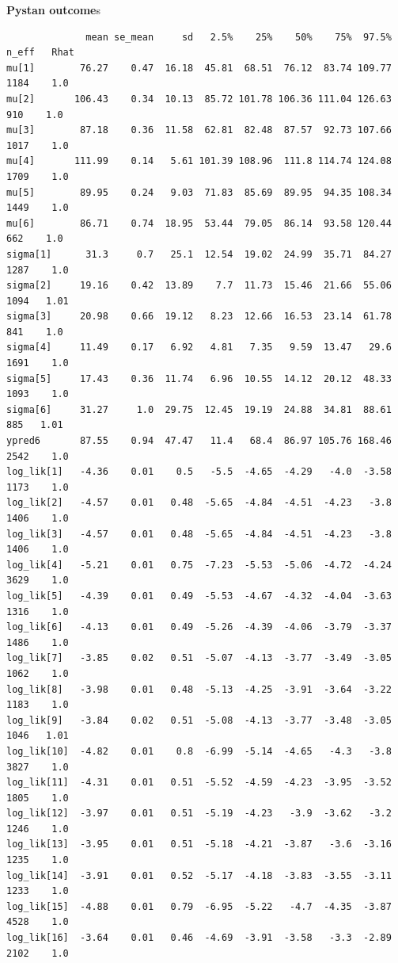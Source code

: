 \documentclass{article}
\begin{document}
\textbf{Pystan outcome}s
\begin{verbatim}
              mean se_mean     sd   2.5%    25%    50%    75%  97.5%  n_eff   Rhat
mu[1]        76.27    0.47  16.18  45.81  68.51  76.12  83.74 109.77   1184    1.0
mu[2]       106.43    0.34  10.13  85.72 101.78 106.36 111.04 126.63    910    1.0
mu[3]        87.18    0.36  11.58  62.81  82.48  87.57  92.73 107.66   1017    1.0
mu[4]       111.99    0.14   5.61 101.39 108.96  111.8 114.74 124.08   1709    1.0
mu[5]        89.95    0.24   9.03  71.83  85.69  89.95  94.35 108.34   1449    1.0
mu[6]        86.71    0.74  18.95  53.44  79.05  86.14  93.58 120.44    662    1.0
sigma[1]      31.3     0.7   25.1  12.54  19.02  24.99  35.71  84.27   1287    1.0
sigma[2]     19.16    0.42  13.89    7.7  11.73  15.46  21.66  55.06   1094   1.01
sigma[3]     20.98    0.66  19.12   8.23  12.66  16.53  23.14  61.78    841    1.0
sigma[4]     11.49    0.17   6.92   4.81   7.35   9.59  13.47   29.6   1691    1.0
sigma[5]     17.43    0.36  11.74   6.96  10.55  14.12  20.12  48.33   1093    1.0
sigma[6]     31.27     1.0  29.75  12.45  19.19  24.88  34.81  88.61    885   1.01
ypred6       87.55    0.94  47.47   11.4   68.4  86.97 105.76 168.46   2542    1.0
log_lik[1]   -4.36    0.01    0.5   -5.5  -4.65  -4.29   -4.0  -3.58   1173    1.0
log_lik[2]   -4.57    0.01   0.48  -5.65  -4.84  -4.51  -4.23   -3.8   1406    1.0
log_lik[3]   -4.57    0.01   0.48  -5.65  -4.84  -4.51  -4.23   -3.8   1406    1.0
log_lik[4]   -5.21    0.01   0.75  -7.23  -5.53  -5.06  -4.72  -4.24   3629    1.0
log_lik[5]   -4.39    0.01   0.49  -5.53  -4.67  -4.32  -4.04  -3.63   1316    1.0
log_lik[6]   -4.13    0.01   0.49  -5.26  -4.39  -4.06  -3.79  -3.37   1486    1.0
log_lik[7]   -3.85    0.02   0.51  -5.07  -4.13  -3.77  -3.49  -3.05   1062    1.0
log_lik[8]   -3.98    0.01   0.48  -5.13  -4.25  -3.91  -3.64  -3.22   1183    1.0
log_lik[9]   -3.84    0.02   0.51  -5.08  -4.13  -3.77  -3.48  -3.05   1046   1.01
log_lik[10]  -4.82    0.01    0.8  -6.99  -5.14  -4.65   -4.3   -3.8   3827    1.0
log_lik[11]  -4.31    0.01   0.51  -5.52  -4.59  -4.23  -3.95  -3.52   1805    1.0
log_lik[12]  -3.97    0.01   0.51  -5.19  -4.23   -3.9  -3.62   -3.2   1246    1.0
log_lik[13]  -3.95    0.01   0.51  -5.18  -4.21  -3.87   -3.6  -3.16   1235    1.0
log_lik[14]  -3.91    0.01   0.52  -5.17  -4.18  -3.83  -3.55  -3.11   1233    1.0
log_lik[15]  -4.88    0.01   0.79  -6.95  -5.22   -4.7  -4.35  -3.87   4528    1.0
log_lik[16]  -3.64    0.01   0.46  -4.69  -3.91  -3.58   -3.3  -2.89   2102    1.0

\end{verbatim}
\end{document}
